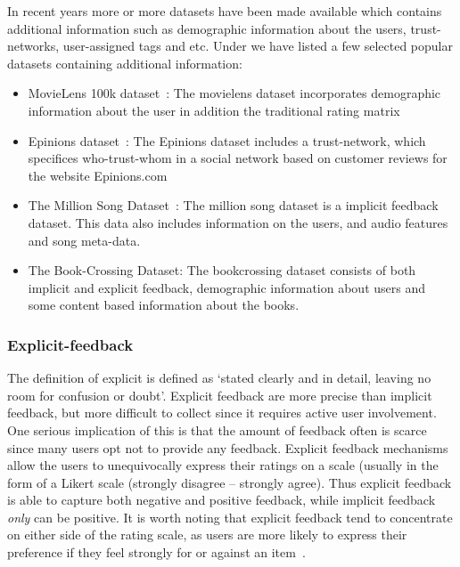 In recent years more or more datasets have been made available which contains
additional information such as demographic information about the users,
trust-networks, user-assigned tags and etc. Under we have listed a few selected
popular datasets containing additional information:


\begin{itemize}

\item MovieLens 100k dataset~\cite{Movielens}: The movielens dataset
	incorporates demographic information about the user in addition the
	traditional rating matrix

\item Epinions dataset~\cite{Epinions}: The Epinions dataset includes a
	trust-network, which specifices who-trust-whom in a social network based on
	customer reviews for the website Epinions.com

\item The Million Song Dataset~\cite{Bertin-Mahieux2011}: The million song
	dataset is a implicit feedback dataset. This data also includes information on the users,
	and audio features and song meta-data.

\item The Book-Crossing Dataset: The bookcrossing dataset consists of both implicit and explicit feedback,
	demographic information about users and some content based information about the books.
\end{itemize}

\subsubsection{Explicit-feedback}
The definition of explicit is defined as `stated clearly and in detail, leaving
no room for confusion or doubt'. Explicit feedback are more precise than
implicit feedback, but more difficult to collect since it requires active user
involvement. One serious implication of this is that the amount of feedback
often is scarce since many users opt not to provide any feedback. Explicit
feedback mechanisms allow the users to unequivocally express their ratings on a
scale (usually in the form of a Likert scale (strongly disagree – strongly
agree). Thus explicit feedback is able to capture both negative and positive
feedback, while implicit feedback \emph{only} can be positive. It is worth
noting that explicit feedback tend to concentrate on either side of the rating
scale, as users are more likely to express their preference if they feel
strongly for or against an item~\cite{Jawaheer2010}.

